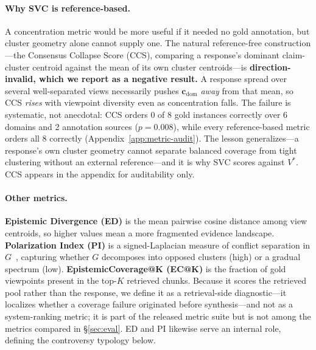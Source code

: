 \documentclass[11pt]{article}
\begin{document}
\paragraph{Why SVC is reference-based.}
A concentration metric would be more useful if it needed no gold annotation, but
cluster geometry alone cannot supply one.  The natural reference-free
construction---the Consensus Collapse Score (CCS), comparing a response's
dominant claim-cluster centroid against the mean of its own cluster
centroids---is \textbf{direction-invalid, which we report as a negative
result.}  A response spread over several well-separated
views necessarily pushes $\mathbf{c}_\mathrm{dom}$ \emph{away} from that mean,
so CCS \emph{rises} with viewpoint diversity even as concentration falls.  The
failure is systematic, not anecdotal: CCS orders 0 of 8 gold instances
correctly over 6 domains and 2 annotation sources ($p{=}0.008$), while every
reference-based metric orders all 8 correctly
(Appendix~\ref{app:metric-audit}).  The lesson generalizes---a response's own
cluster geometry cannot separate balanced coverage from tight clustering
without an external reference---and it is why SVC scores against $V^*$.  CCS
appears in the appendix for auditability only.

\paragraph{Other metrics.}
\textbf{Epistemic Divergence (ED)} is the mean pairwise cosine distance among
view centroids, so higher values mean a more fragmented evidence landscape.
\textbf{Polarization Index (PI)} is a signed-Laplacian measure of conflict
separation in $G$~\citep{traag2009community}, capturing whether $G$ decomposes
into opposed clusters (high) or a gradual spectrum (low).
\textbf{EpistemicCoverage@K (EC@K)} is the fraction of gold viewpoints present
in the top-$K$ retrieved chunks.  Because it scores the retrieved pool rather
than the response, we define it as a retrieval-side diagnostic---it localizes
whether a coverage failure originated before synthesis---and not as a
system-ranking metric; it is part of the released metric suite but is not among
the metrics compared in \S\ref{sec:eval}.  ED and PI likewise serve an internal
role, defining the controversy typology below.
\end{document}
